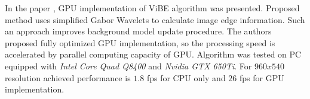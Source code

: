 \documentclass[b5paper,10pt,twoside]{article}
\begin{document}
{In the paper \cite{Qin_2015}, GPU implementation of ViBE algorithm was presented. Proposed method uses simplified Gabor Wavelets to calculate image edge information. Such an approach improves background model update procedure. The authors proposed fully optimized GPU implementation, so the processing speed is accelerated by parallel computing capacity of GPU. Algorithm was tested on PC equipped with \textit{Intel Core Quad Q8400} and \textit{Nvidia GTX 650Ti}. For $960x540$ resolution achieved performance is $1.8$ fps for CPU only and $26$ fps for GPU implementation.   
 

%

}
\end{document}

